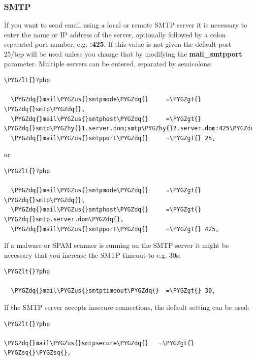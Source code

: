 \documentclass[letterpaper,10pt,english]{sphinxmanual}
\def\PYGZus{\char`\_}
\def\PYGZlt{\char`\<}
\def\PYGZgt{\char`\>}
\def\PYGZhy{\char`\-}
\def\PYGZsq{\char`\'}
\def\PYGZdq{\char`\"}
\renewcommand\PYGZsq{\textquotesingle}
\begin{document}
\subsubsection{SMTP}
\label{configuration_server/email_configuration:smtp}
If you want to send email using a local or remote SMTP server it is necessary
to enter the name or IP address of the server, optionally followed by a colon
separated port number, e.g. \textbf{:425}. If this value is not given the default
port 25/tcp will be used unless you change that by modifying the
\textbf{mail\_smtpport} parameter. Multiple servers can be entered, separated by
semicolons:

\begin{Verbatim}[commandchars=\\\{\}]
\PYGZlt{}?php

  \PYGZdq{}mail\PYGZus{}smtpmode\PYGZdq{}     =\PYGZgt{} \PYGZdq{}smtp\PYGZdq{},
  \PYGZdq{}mail\PYGZus{}smtphost\PYGZdq{}     =\PYGZgt{} \PYGZdq{}smtp\PYGZhy{}1.server.dom;smtp\PYGZhy{}2.server.dom:425\PYGZdq{},
  \PYGZdq{}mail\PYGZus{}smtpport\PYGZdq{}     =\PYGZgt{} 25,
\end{Verbatim}

or

\begin{Verbatim}[commandchars=\\\{\}]
\PYGZlt{}?php

  \PYGZdq{}mail\PYGZus{}smtpmode\PYGZdq{}     =\PYGZgt{} \PYGZdq{}smtp\PYGZdq{},
  \PYGZdq{}mail\PYGZus{}smtphost\PYGZdq{}     =\PYGZgt{} \PYGZdq{}smtp.server.dom\PYGZdq{},
  \PYGZdq{}mail\PYGZus{}smtpport\PYGZdq{}     =\PYGZgt{} 425,
\end{Verbatim}

If a malware or SPAM scanner is running on the SMTP server it might be
necessary that you increase the SMTP timeout to e.g. 30s:

\begin{Verbatim}[commandchars=\\\{\}]
\PYGZlt{}?php

  \PYGZdq{}mail\PYGZus{}smtptimeout\PYGZdq{}  =\PYGZgt{} 30,
\end{Verbatim}

If the SMTP server accepts insecure connections, the default setting can be
used:

\begin{Verbatim}[commandchars=\\\{\}]
\PYGZlt{}?php

\PYGZdq{}mail\PYGZus{}smtpsecure\PYGZdq{}   =\PYGZgt{} \PYGZsq{}\PYGZsq{},
\end{Verbatim}
\end{document}
